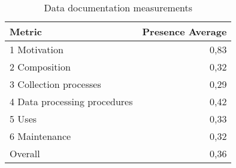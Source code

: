 \begin{table}[t]
\caption{Data documentation measurements}
\label{tab:dts-average}
\begin{tabular}{|l|r|}
\hline
Metric & Presence Average \\
\hline
1 Motivation & 0,83 \\
2 Composition & 0,32 \\
3 Collection processes & 0,29 \\
4 Data processing procedures & 0,42 \\
5 Uses & 0,33 \\
6 Maintenance & 0,32 \\
Overall & 0,36 \\
\hline
\end{tabular}
\end{table}

